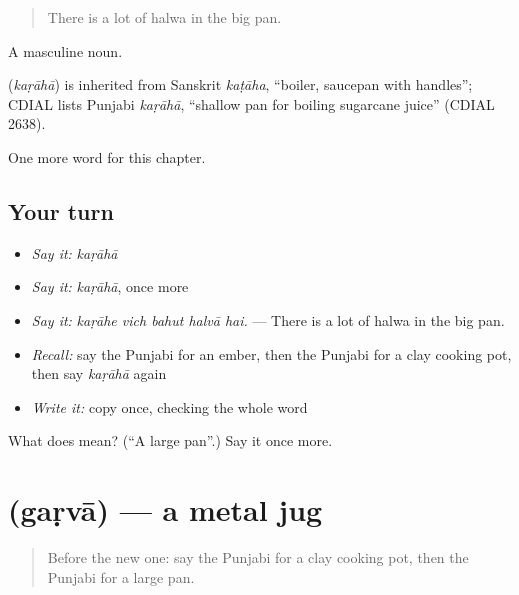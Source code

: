 \begin{quote}
There is a lot of halwa in the big pan.
\end{quote}

A masculine noun.

\begin{cousinweb}
\textbf{} (\emph{kaṛāhā}) is inherited from Sanskrit \emph{kaṭāha}, \textquotedblleft{}boiler, saucepan with handles\textquotedblright{}; CDIAL lists Punjabi \emph{kaṛāhā}, \textquotedblleft{}shallow pan for boiling sugarcane juice\textquotedblright{} (CDIAL 2638).
\end{cousinweb}

\begin{grammarlens}[title={What you've built}]
One more word for this chapter.
\end{grammarlens}

\subsection*{Your turn}
\begin{itemize}
\raggedright
  \item \emph{Say it:} \emph{kaṛāhā}
  \item \emph{Say it:} \emph{kaṛāhā}, once more
  \item \emph{Say it:} \emph{kaṛāhe vich bahut halvā hai.} — There is a lot of halwa in the big pan.
  \item \emph{Recall:} say the Punjabi for an ember, then the Punjabi for a clay cooking pot, then say \emph{kaṛāhā} again
  \item \emph{Write it:} copy \textbf{} once, checking the whole word
\end{itemize}

\begin{tcolorbox}[breakable,colback=teal!4,colframe=teal!35!black,title={Before you move on}]
What does  mean? (\textquotedblleft{}A large pan\textquotedblright{}.) Say it once more.
\end{tcolorbox}
\section[\texorpdfstring{\pa{ਗੜਵਾ} (gaṛvā)}{ਗੜਵਾ (gaṛvā)}]{ (gaṛvā) — a metal jug}

\label{lesson:PA-C250-garva}



\begin{quote}
Before the new one: say the Punjabi for a clay cooking pot, then the Punjabi for a large pan.
\end{quote}

